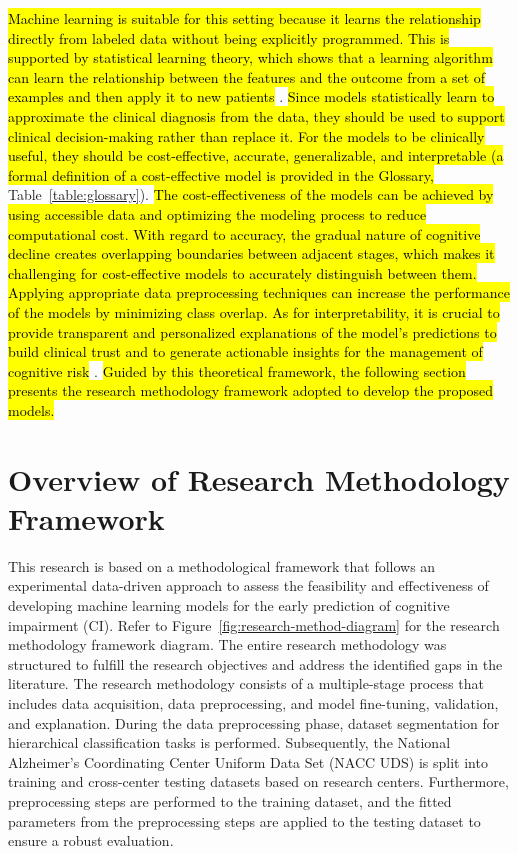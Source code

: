 \hl{Machine learning is suitable for this setting because it learns the relationship directly from labeled data without being explicitly programmed. This is supported by statistical learning theory, which shows that a learning algorithm can learn the relationship between the features and the outcome from a set of examples and then apply it to new patients} \cite{Hastie2009Elements}. \hl{Since models statistically learn to approximate the clinical diagnosis from the data, they should be used to support clinical decision-making rather than replace it. For the models to be clinically useful, they should be cost-effective, accurate, generalizable, and interpretable (a formal definition of a cost-effective model is provided in the Glossary, } Table~\ref{table:glossary}). \hl{The cost-effectiveness of the models can be achieved by using accessible data and optimizing the modeling process to reduce computational cost. With regard to accuracy, the gradual nature of cognitive decline creates overlapping boundaries between adjacent stages, which makes it challenging for cost-effective models to accurately distinguish between them. Applying appropriate data preprocessing techniques can increase the performance of the models by minimizing class overlap. As for interpretability, it is crucial to provide transparent and personalized explanations of the model's predictions to build clinical trust and to generate actionable insights for the management of cognitive risk} \cite{Martin2023Interpretable}. \hl{Guided by this theoretical framework, the following section presents the research methodology framework adopted to develop the proposed models.}

\section{Overview of Research Methodology Framework}
This research is based on a methodological framework that follows an experimental data-driven approach to assess the feasibility and effectiveness of developing machine learning models for the early prediction of cognitive impairment (\acrshort{CI}). Refer to Figure~\ref{fig:research-method-diagram} for the research methodology framework diagram. The entire research methodology was structured to fulfill the research objectives and address the identified gaps in the literature. The research methodology consists of a multiple-stage process that includes data acquisition, data preprocessing, and model fine-tuning, validation, and explanation. During the data preprocessing phase, dataset segmentation for hierarchical classification tasks is performed. Subsequently, the National Alzheimer's Coordinating Center Uniform Data Set (\acrshort{NACC} \acrshort{UDS}) is split into training and cross-center testing datasets based on research centers. Furthermore, preprocessing steps are performed to the training dataset, and the fitted parameters from the preprocessing steps are applied to the testing dataset to ensure a robust evaluation. 

